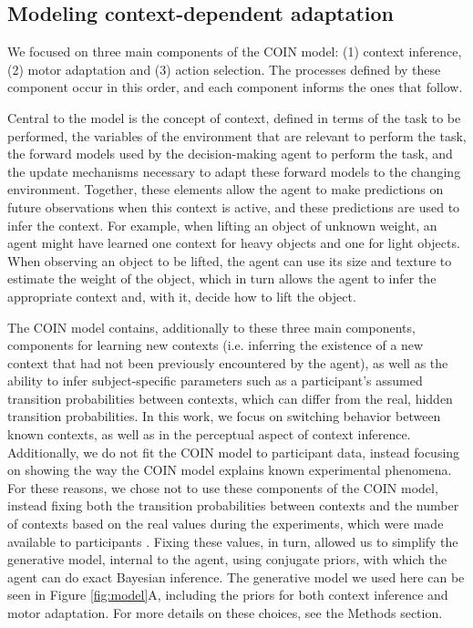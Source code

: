 \documentclass[a4paper,doc,floatsintext,natbib]{apa6}
\def \fref #1{Figure \ref{#1}}     %
\begin{document}
\subsection{Modeling context-dependent adaptation}
We focused on three main components of the COIN model: (1) context inference, (2) motor adaptation and (3) action selection. The processes defined by these component occur in this order, and each component informs the ones that follow.

Central to the model is the concept of context, defined in terms of the task to be performed, the variables of the environment that are relevant to perform the task, the forward models used by the decision-making agent to perform the task, and the update mechanisms necessary to adapt these forward models to the changing environment. Together, these elements allow the agent to make predictions on future observations when this context is active, and these predictions are used to infer the context. For example, when lifting an object of unknown weight, an agent might have learned one context for heavy objects and one for light objects. When observing an object to be lifted, the agent can use its size and texture to estimate the weight of the object, which in turn allows the agent to infer the appropriate context and, with it, decide how to lift the object.

The COIN model contains, additionally to these three main components, components for learning new contexts (i.e. inferring the existence of a new context that had not been previously encountered by the agent), as well as the ability to infer subject-specific parameters such as a participant's assumed transition probabilities between contexts, which can differ from the real, hidden transition probabilities. In this work, we focus on switching behavior between known contexts, as well as in the perceptual aspect of context inference. Additionally, we do not fit the COIN model to participant data, instead focusing on showing the way the COIN model explains known experimental phenomena. For these reasons, we chose not to use these components of the COIN model, instead fixing both the transition probabilities between contexts and the number of contexts based on the real values during the experiments, which were made available to participants . Fixing these values, in turn, allowed us to simplify the generative model, internal to the agent, using conjugate priors, with which the agent can do exact Bayesian inference. The generative model we used here can be seen in \fref{fig:model}A, including the priors for both context inference and motor adaptation. For more details on these choices, see the Methods section.
\end{document}
